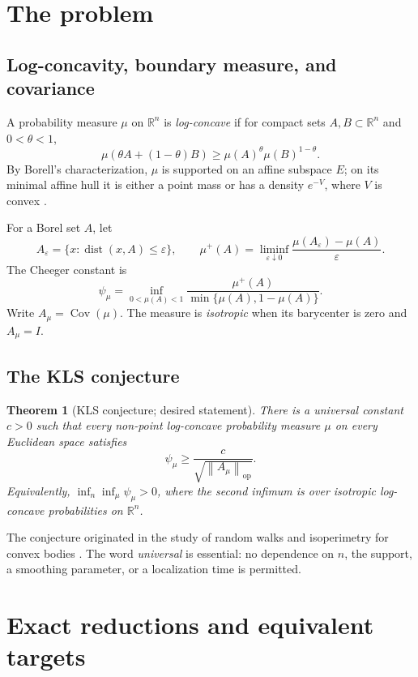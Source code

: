 \documentclass[11pt]{article}
\newtheorem{theorem}{Theorem}[section]
\theoremstyle{definition}
\theoremstyle{remark}
\newcommand{\R}{\mathbb R}
\newcommand{\Cov}{\operatorname{Cov}}
\newcommand{\op}{\mathrm{op}}
\newcommand{\1}{\mathbf 1}
\newcommand{\norm}[1]{\left\lVert #1\right\rVert}
\begin{document}
\tableofcontents

\section{The problem}

\subsection{Log-concavity, boundary measure, and covariance}

A probability measure \(\mu\) on \(\R^n\) is \emph{log-concave} if for
compact sets \(A,B\subset\R^n\) and \(0<\theta<1\),
\[
 \mu(\theta A+(1-\theta)B)
 \ge \mu(A)^\theta\mu(B)^{1-\theta}.
\]
By Borell's characterization, \(\mu\) is supported on an affine subspace
\(E\); on its minimal affine hull it is either a point mass or has a
density \(e^{-V}\), where \(V\) is convex \cite{Borell1975}.

For a Borel set \(A\), let
\[
 A_\varepsilon=\{x:\operatorname{dist}(x,A)\le\varepsilon\},
 \qquad
 \mu^+(A)=\liminf_{\varepsilon\downarrow0}
 \frac{\mu(A_\varepsilon)-\mu(A)}{\varepsilon}.
\]
The Cheeger constant is
\[
 \psi_\mu=
 \inf_{0<\mu(A)<1}
 \frac{\mu^+(A)}{\min\{\mu(A),1-\mu(A)\}}.
\]
Write \(A_\mu=\Cov(\mu)\).  The measure is \emph{isotropic} when its
barycenter is zero and \(A_\mu=I\).

\subsection{The KLS conjecture}

\begin{theorem}[KLS conjecture; desired statement]
There is a universal constant \(c>0\) such that every non-point
log-concave probability measure \(\mu\) on every Euclidean space satisfies
\[
 \boxed{\qquad
 \psi_\mu\ge \frac{c}{\sqrt{\norm{A_\mu}_{\op}}}.
 \qquad}                                             \tag{KLS}
\]
Equivalently, \(\inf_n\inf_\mu\psi_\mu>0\), where the second infimum is
over isotropic log-concave probabilities on \(\R^n\).
\end{theorem}

The conjecture originated in the study of random walks and isoperimetry
for convex bodies \cite{KLS1995}.  The word \emph{universal} is essential:
no dependence on \(n\), the support, a smoothing parameter, or a
localization time is permitted.

\section{Exact reductions and equivalent targets}
\end{document}
